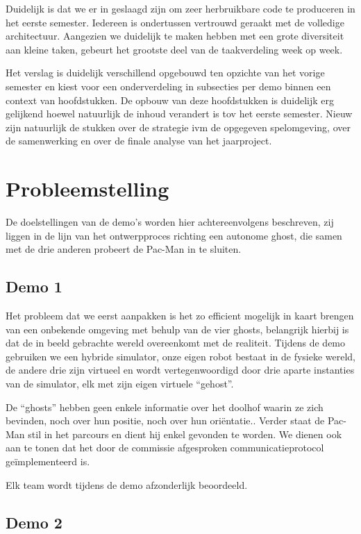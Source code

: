\documentclass[12pt,a4paper]{report}
\begin{document}
Duidelijk is dat we er in geslaagd zijn om zeer herbruikbare code te produceren in het eerste semester. Iedereen is ondertussen vertrouwd geraakt met de volledige architectuur. Aangezien we duidelijk te maken hebben met een grote diversiteit aan kleine taken, gebeurt het grootste deel van de taakverdeling week op week.

Het verslag is duidelijk verschillend opgebouwd ten opzichte van het vorige semester en kiest voor een onderverdeling in subsecties per demo binnen een context van hoofdstukken. De opbouw van deze hoofdstukken is duidelijk erg gelijkend hoewel natuurlijk de inhoud verandert is tov het eerste semester. Nieuw zijn natuurlijk de stukken over de strategie ivm de opgegeven spelomgeving, over de samenwerking en over de finale analyse van het jaarproject.

\chapter{Probleemstelling}

De doelstellingen van de demo's worden hier achtereenvolgens beschreven, zij liggen in de lijn van het ontwerpproces richting een autonome ghost, die samen met de drie anderen probeert de Pac-Man in te sluiten.

\section{Demo 1}

Het probleem dat we eerst aanpakken is het zo efficient mogelijk in kaart brengen van een onbekende omgeving met behulp van de vier ghosts, belangrijk hierbij is dat de in beeld gebrachte wereld overeenkomt met de realiteit. Tijdens de demo gebruiken we een hybride simulator, onze eigen robot bestaat in de fysieke wereld, de andere drie zijn virtueel en wordt vertegenwoordigd door drie aparte instanties van de simulator, elk met zijn eigen virtuele ``gehost''.

De ``ghosts'' hebben geen enkele informatie over het doolhof waarin ze zich bevinden, noch over hun positie, noch over hun ori\"entatie.. Verder staat de Pac-Man stil in het parcours en dient hij enkel gevonden te worden. We dienen ook aan te tonen dat het door de commissie afgesproken communicatieprotocol ge\"implementeerd is.

Elk team wordt tijdens de demo afzonderlijk beoordeeld.
 
\section{Demo 2}
 
\end{document}
